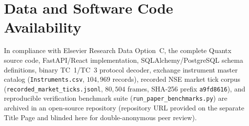 \documentclass[12pt]{article}
\begin{document}
\section*{Data and Software Code Availability}
In compliance with Elsevier Research Data Option~C, the complete Quantx source code, FastAPI/React implementation, SQLAlchemy/PostgreSQL schema definitions, binary TC~1/TC~3 protocol decoder, exchange instrument master catalog (\texttt{Instruments.csv}, $104{,}969$ records), recorded NSE market tick corpus (\texttt{recorded\_market\_ticks.jsonl}, $80{,}504$ frames, SHA-256 prefix \texttt{a9fd8616}), and reproducible verification benchmark suite (\texttt{run\_paper\_benchmarks.py}) are archived in an open-source repository (repository URL provided on the separate Title Page and blinded here for double-anonymous peer review).

\begin{singlespace}


\end{singlespace}
\end{document}
